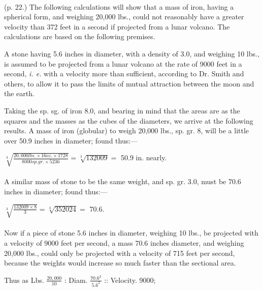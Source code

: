 \documentclass[a4paper, 12pt, oneside]{article}
\begin{document}
\paragraph{}
(p. 22.) The following calculations will show that a mass of iron, having a spherical form, and weighing 20,000 lbs., could not reasonably have a greater velocity than 372 feet in a second if projected from a lunar volcano. The calculations are based on the following premises.

A stone having 5.6 inches in diameter, with a density of 3.0, and weighing 10 lbs., is assumed to be projected from a lunar volcano at the rate of 9000 feet in a second, \emph{i. e.} with a velocity more than sufficient, according to Dr. Smith and others, to allow it to pass the limits of mutual attraction between the moon and the earth.

Taking the sp. sg. of iron 8.0, and bearing in mind that the areas are as the squares and the masses as the cubes of the diameters, we arrive at the following results. A mass of iron (globular) to weigh 20,000 lbs., sp. gr. 8, will be a little over 50.9 inches in diameter; found thus:---
\begin{center}
\normalsize
$ \sqrt[3]{ \frac{20,000 lbs. \times 16 oz. \times 1728}{8000 sp. gr. \times 5236} } = \sqrt[3]{ 132009 } = $ 50.9 in. nearly.
\end{center}
\paragraph{}
A similar mass of stone to be the same weight, and sp. gr. 3.0, must be 70.6 inches in diameter; found thus:---
\begin{center}
\normalsize
$ \sqrt[3]{ \frac{132009 \times 8}{3} } = \sqrt[3]{ 352024 } = $ 70.6.
\end{center}
\paragraph{}
Now if a piece of stone 5.6 inches in diameter, weighing 10 lbs., be projected with a velocity of 9000 feet per second, a mass 70.6 inches diameter, and weighing 20,000 lbs., could only be projected with a velocity of 715 feet per second, because the weights would increase so much faster than the sectional area.
\begin{center}
\normalsize
Thus as Lbs. $\frac{20,000}{10}$ : Diam. $\frac{70.6^2}{5.6^2}$ :: Velocity. 9000;
\end{center}
\end{document}
